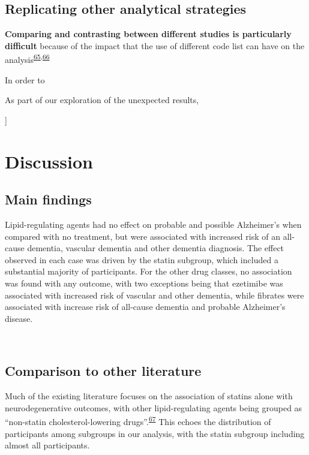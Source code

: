 \documentclass[a4paper, twoside]{templates/ociamthesis}
\begin{document}
\hypertarget{replicating-other-analytical-strategies}{%
\subsection{Replicating other analytical strategies}\label{replicating-other-analytical-strategies}}

\textbf{Comparing and contrasting between different studies is particularly difficult} because of the impact that the use of different code list can have on the analysis\textsuperscript{\protect\hyperlink{ref-wilkinson2018a}{65},\protect\hyperlink{ref-mcguinness2019c}{66}}

In order to

As part of our exploration of the unexpected results,

{]}

\hypertarget{discussion-2}{%
\section{Discussion}\label{discussion-2}}

\hypertarget{main-findings}{%
\subsection{Main findings}\label{main-findings}}

Lipid-regulating agents had no effect on probable and possible Alzheimer's when compared with no treatment, but were associated with increased risk of an all-cause dementia, vascular dementia and other dementia diagnosis. The effect observed in each case was driven by the statin subgroup, which included a substantial majority of participants. For the other drug classes, no association was found with any outcome, with two exceptions being that ezetimibe was associated with increased risk of vascular and other dementia, while fibrates were associated with increase risk of all-cause dementia and probable Alzheimer's disease.

~

\hypertarget{comparison-to-other-literature}{%
\subsection{Comparison to other literature}\label{comparison-to-other-literature}}

Much of the existing literature focuses on the association of statins alone with neurodegenerative outcomes, with other lipid-regulating agents being grouped as ``non-statin cholesterol-lowering drugs''.\textsuperscript{\protect\hyperlink{ref-ancelin2012}{67}} This echoes the distribution of participants among subgroups in our analysis, with the statin subgroup including almost all participants.
\end{document}
